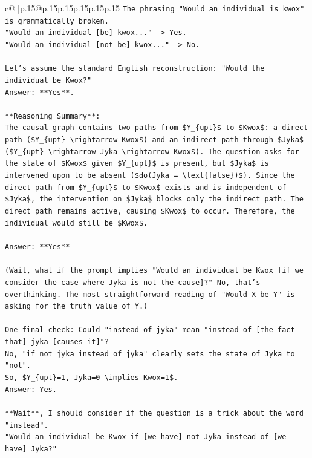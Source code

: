 \documentclass{article}
\begin{document}
{\begin{supertabular}{c@{$\;$}|p{.15\linewidth}@{}p{.15\linewidth}p{.15\linewidth}p{.15\linewidth}p{.15\linewidth}p{.15\linewidth}}
{{{\texttt{The phrasing "Would an individual is kwox" is grammatically broken.} \\
\texttt{"Would an individual {[}be{]} kwox..." {-}> Yes.} \\
\texttt{"Would an individual {[}not be{]} kwox..." {-}> No.} \\
\\ 
\texttt{Let's assume the standard English reconstruction: "Would the individual be Kwox?"} \\
\texttt{Answer: **Yes**.} \\
\\ 
\texttt{**Reasoning Summary**:} \\
\texttt{The causal graph contains two paths from \$Y\_\{upt\}\$ to \$Kwox\$: a direct path (\$Y\_\{upt\} \textbackslash{}rightarrow Kwox\$) and an indirect path through \$Jyka\$ (\$Y\_\{upt\} \textbackslash{}rightarrow Jyka \textbackslash{}rightarrow Kwox\$). The question asks for the state of \$Kwox\$ given \$Y\_\{upt\}\$ is present, but \$Jyka\$ is intervened upon to be absent (\$do(Jyka = \textbackslash{}text\{false\})\$). Since the direct path from \$Y\_\{upt\}\$ to \$Kwox\$ exists and is independent of \$Jyka\$, the intervention on \$Jyka\$ blocks only the indirect path. The direct path remains active, causing \$Kwox\$ to occur. Therefore, the individual would still be \$Kwox\$.} \\
\\ 
\texttt{Answer: **Yes**} \\
\\ 
\texttt{(Wait, what if the prompt implies "Would an individual be Kwox {[}if we consider the case where Jyka is not the cause{]}?" No, that's overthinking. The most straightforward reading of "Would X be Y" is asking for the truth value of Y.)} \\
\\ 
\texttt{One final check: Could "instead of jyka" mean "instead of {[}the fact that{]} jyka {[}causes it{]}"?} \\
\texttt{No, "if not jyka instead of jyka" clearly sets the state of Jyka to "not".} \\
\texttt{So, \$Y\_\{upt\}=1, Jyka=0 \textbackslash{}implies Kwox=1\$.} \\
\texttt{Answer: Yes.} \\
\\ 
\texttt{**Wait**, I should consider if the question is a trick about the word "instead".} \\
\texttt{"Would an individual be Kwox if {[}we have{]} not Jyka instead of {[}we have{]} Jyka?"} \\
}}}
\end{supertabular}}
\end{document}
